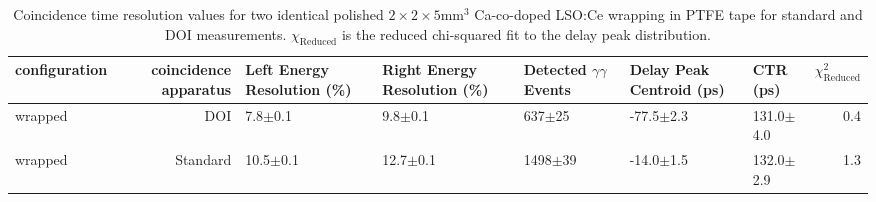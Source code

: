 \begin{table}
\caption{\label{tab:referencevals} Coincidence time resolution values for two identical polished $2\times2\times5$mm$^3$ Ca-co-doped LSO:Ce wrapping in PTFE tape for standard and DOI measurements. $\chi_\text{Reduced}$ is the reduced chi-squared fit to the delay peak distribution.}
\begin{tabular}{lrlllllr}
configuration &  coincidence apparatus & Left Energy Resolution (\%) & Right Energy Resolution (\%) & Detected $\gamma\gamma$ Events & Delay Peak Centroid (ps) & CTR (ps) &  $\chi^2_\text{Reduced}$ \\
\hline
      wrapped &     DOI &   7.8$\pm$0.1 &   9.8$\pm$0.1 &   637$\pm$25 &   -77.5$\pm$2.3 &  131.0$\pm$4.0 &        0.4 \\
      wrapped &   Standard &  10.5$\pm$0.1 &  12.7$\pm$0.1 &  1498$\pm$39 &   -14.0$\pm$1.5 &  132.0$\pm$2.9 &        1.3 \\
\hline
\end{tabular}
\end{table}
